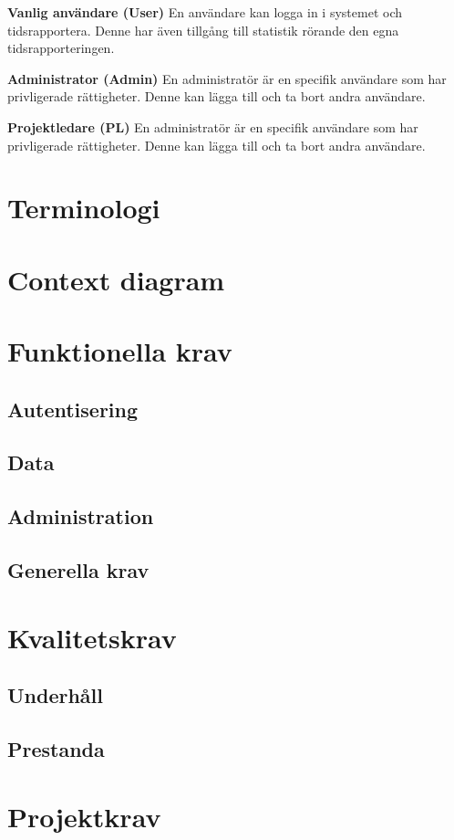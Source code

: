 \textbf{Vanlig användare (User)} En användare kan logga in i systemet och tidsrapportera. Denne har även tillgång till statistik rörande den egna tidsrapporteringen.

\textbf{Administrator (Admin)} En administratör är en specifik användare som har privligerade rättigheter. Denne kan lägga till och ta bort andra användare.

\textbf{Projektledare (PL)} En administratör är en specifik användare som har privligerade rättigheter. Denne kan lägga till och ta bort andra användare.

\pagebreak
\section{Terminologi}
\section{Context diagram}
\section{Funktionella krav}
\subsection{Autentisering}
\subsection{Data}
\subsection{Administration}
\subsection{Generella krav}
\section{Kvalitetskrav}
\subsection{Underhåll}
\subsection{Prestanda}
\section{Projektkrav}
